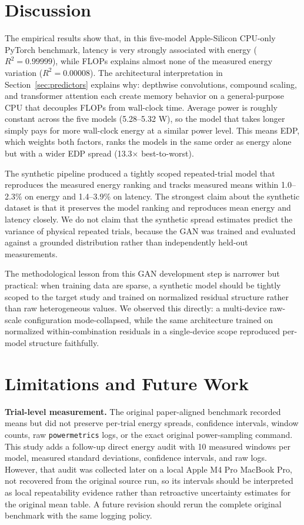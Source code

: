 \documentclass{svproc}
\begin{document}
\section{Discussion}
The empirical results show that, in this five-model Apple-Silicon CPU-only
PyTorch benchmark, latency is very strongly associated with energy
($R^2 = 0.99999$), while FLOPs explains almost none of the measured energy
variation ($R^2 = 0.00008$). The architectural
interpretation in Section~\ref{sec:predictors} explains why: depthwise
convolutions, compound scaling, and transformer attention each create memory
behavior on a general-purpose CPU that decouples FLOPs from wall-clock time.
Average power is roughly constant across the five models (5.28--5.32 W), so
the model that takes longer simply pays for more wall-clock energy at a
similar power level. This means EDP, which weights both factors, ranks the
models in the same order as energy alone but with a wider EDP spread
(13.3$\times$ best-to-worst).

The synthetic pipeline produced a tightly scoped repeated-trial model that
reproduces the measured energy ranking and tracks measured means within
1.0--2.3\% on energy and 1.4--3.9\% on latency. The strongest claim about
the synthetic dataset is that it preserves the model ranking and reproduces
mean energy and latency closely. We do not claim that the synthetic spread
estimates predict the variance of physical repeated trials, because the GAN
was trained and evaluated against a grounded distribution rather than
independently held-out measurements.

The methodological lesson from this GAN development step is narrower but
practical: when training data are sparse, a synthetic model should be tightly
scoped to the target study and trained on normalized residual structure rather
than raw heterogeneous values. We observed this directly: a multi-device
raw-scale configuration mode-collapsed, while the same architecture trained
on normalized within-combination residuals in a single-device scope reproduced
per-model structure faithfully.

\section{Limitations and Future Work}
\label{sec:limitations}
\textbf{Trial-level measurement.} The original paper-aligned benchmark
recorded means but did not preserve per-trial energy spreads, confidence
intervals, window counts, raw \texttt{powermetrics} logs, or the exact
original power-sampling command. This study adds a follow-up direct
energy audit with 10 measured windows per model, measured standard deviations,
confidence intervals, and raw logs. However, that audit was collected later on
a local Apple M4 Pro MacBook Pro, not recovered from the original source run, so
its intervals should be interpreted as local repeatability evidence rather
than retroactive uncertainty estimates for the original mean table. A future
revision should rerun the complete original benchmark with the same logging
policy.
\end{document}

